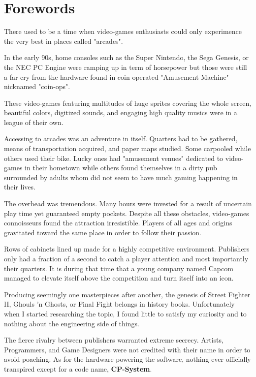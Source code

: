 \chapter*{Forewords}

There used to be a time when video-games enthusiasts could only experimence the very best in places called "arcades". 

In the early 90s, home consoles such as the Super Nintendo, the Sega Genesis, or the NEC PC Engine were ramping up in term of horsepower but those were still a far cry from the hardware found in coin-operated "Amusement Machine" nicknamed "coin-ops".

These video-games featuring multitudes of huge sprites covering the whole screen, beautiful colors, digitized sounds, and engaging high quality musics were in a league of their own.

Accessing to arcades was an adventure in itself. Quarters had to be gathered, means of transportation acquired, and paper maps studied. Some carpooled while others used their bike. Lucky ones had "amusement venues" dedicated to video-games in their hometown while others found themselves in a dirty pub surrounded by adults whom did not seem to have much gaming happening in their lives. 

The overhead was tremendous. Many hours were invested for a result of uncertain play time yet guaranteed empty pockets. Despite all these obstacles, video-games connoisseurs found the attraction irresistible. Players of all ages and origins gravitated toward the same place in order to follow their passion. 

Rows of cabinets lined up made for a highly competitive environment. Publishers only had a fraction of a second to catch a player attention and most importantly their quarters. It is during that time that a young company named Capcom  managed to elevate itself above the competition and turn itself into an icon.

Producing seemingly one masterpieces after another, the genesis of Street Fighter II, Ghouls 'n Ghosts, or Final Fight belongs in history books. Unfortunately when I started researching the topic, I found little to satisfy my curiosity and 	 to nothing about the engineering side of things. 

The fierce rivalry between publishers warranted extreme secrecy. Artists, Programmers, and Game Designers were not credited with their name in order to avoid poaching. As for the hardware powering the software, nothing ever officially transpired except for a code name, \textbf{CP-System}.

